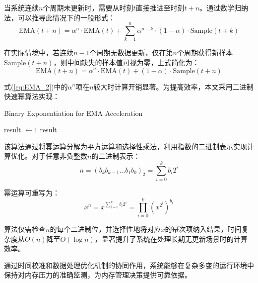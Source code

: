 当系统连续\(n\)个周期未更新时，需要从时刻\(t\)直接推进至时刻\(t+n\)。通过数学归纳法，可以推导此情况下的一般形式：
\begin{equation}
\text{EMA}(t+n) = \alpha^n \cdot \text{EMA}(t) + \sum_{k=1}^{n} \alpha^{n-k} \cdot (1-\alpha) \cdot \text{Sample}(t+k)
\end{equation}

在实际情境中，若连续\(n-1\)个周期无数据更新，仅在第\(n\)个周期获得新样本\(\text{Sample}(t+n)\)，则中间缺失的样本值可视为零，上式简化为：
\begin{equation}
\label{eq:EMA_2}
\text{EMA}(t+n) = \alpha^n \cdot \text{EMA}(t) + (1-\alpha) \cdot \text{Sample}(t+n)
\end{equation}

式(\ref{eq:EMA_2})中的\(\alpha^n\)项在\(n\)较大时计算开销显著。为提高效率，本文采用二进制快速幂算法实现：

\begin{algorithm}[htbp]
    \caption{Binary Exponentiation for EMA Acceleration}
    \label{alg:fast_exp}
    \SetAlgoLined
    
    
    result \(\gets 1\)\;
    \Return result\;
\end{algorithm}

该算法通过将幂运算分解为平方运算和选择性乘法，利用指数的二进制表示实现计算优化。对于任意非负整数\(n\)的二进制表示：
\begin{equation}
n = (b_k b_{k-1} \ldots b_1 b_0)_2 = \sum_{i=0}^{k} b_i 2^i
\end{equation}

幂运算可重写为：
\begin{equation}
x^n = x^{\sum_{i=0}^{k} b_i 2^i} = \prod_{i=0}^k (x^{2^i})^{b_i}
\end{equation}

算法仅需检查\(n\)的每个二进制位，并选择性地将对应\(x\)的幂次项纳入结果，时间复杂度从\(O(n)\)降至\(O(\log n)\)，显著提升了系统在处理长期无更新场景时的计算效率。

通过时间校准和数据处理优化机制的协同作用，系统能够在复杂多变的运行环境中保持对内存压力的准确监测，为内存管理决策提供可靠依据。


